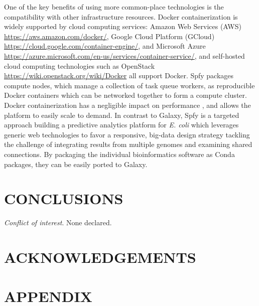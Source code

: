 \documentclass{article}
\begin{document}
One of the key benefits of using more common-place technologies is the compatibility with other infrastructure resources.
Docker containerization is widely supported by cloud computing services: Amazon Web Services (AWS) \url{https://aws.amazon.com/docker/}, Google Cloud Platform (GCloud) \url{https://cloud.google.com/container-engine/}, and Microsoft Azure \url{https://azure.microsoft.com/en-us/services/container-service/}, and self-hosted cloud computing technologies such as OpenStack \url{https://wiki.openstack.org/wiki/Docker} all support Docker.
Spfy packages compute nodes, which manage a collection of task queue workers, as reproducible Docker containers which can be networked together to form a compute cluster.
Docker containerization has a negligible impact on performance \cite{di2015impact}, and allows the platform to easily scale to demand.
In contrast to Galaxy, Spfy is a targeted approach building a predictive analytics platform for \textit{E. coli} which leverages generic web technologies to favor a responsive, big-data design strategy tackling the challenge \cite{fricke2014bacterial} of integrating results from multiple genomes and examining shared connections.
By packaging the individual bioinformatics software as Conda packages, they can be easily ported to Galaxy.

\section{CONCLUSIONS}

\textit{Conflict of interest}. None declared.

\section{ACKNOWLEDGEMENTS}

\newpage




\newpage

\section{APPENDIX}
\end{document}
